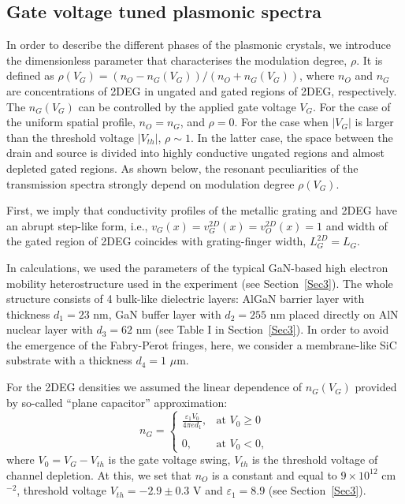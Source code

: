 \documentclass[%
 reprint,
 amsmath,amssymb,
 aps,
]{revtex4-2}
\begin{document}
\subsection{Gate voltage tuned plasmonic spectra}
In order to describe the different phases of the plasmonic crystals, we introduce the dimensionless parameter that characterises the modulation degree, $\rho$. It is defined as $\rho(V_G )=(n_O-n_G (V_G))/(n_{O}+n_{G}(V_G)) $, where $n_{O}$ and $n_{G}$ are concentrations of 2DEG in ungated and gated regions of 2DEG, respectively. The $n_G (V_G)$ can be controlled by the applied gate voltage $V_G$.
For the case of the uniform spatial profile,  $n_O = n_G$,  and  $\rho=0$.  For the case when $|V_G|$ is larger than the threshold voltage $|V_{th}|$, $\rho \sim 1$. In the latter case, the space between the drain and source is divided into highly conductive ungated regions and almost depleted gated regions. As shown below, the resonant peculiarities of the transmission spectra strongly depend on modulation degree $\rho (V_G)$.

First, we imply that conductivity profiles of the metallic grating and 2DEG have an abrupt step-like form, i.e., $v_G (x)= v_G^{2D} (x) = v_O^{2D} (x) = 1$ and width of the gated region of 2DEG coincides with grating-finger width, $L_G^{2D} = L_G$.

In calculations, we used the parameters of the typical GaN-based high electron mobility heterostructure used in the experiment (see Section~\ref{Sec3}).
The whole structure consists of 4 bulk-like dielectric layers:  AlGaN barrier layer with thickness $d_{1}=23$ nm, GaN buffer layer with $d_{2}=255$ nm placed directly on AlN nuclear layer with $d_{3}=62$ nm (see Table I  in Section~\ref{Sec3}). In order to avoid the emergence of the Fabry-P$\acute{\text{e}}$rot fringes, here, we consider a membrane-like SiC substrate with a thickness  $d_{4}=1$ $\mu$m.

For the 2DEG densities we assumed the linear dependence of $n_{G}(V_G)$ provided by so-called “plane capacitor” approximation:
\begin{equation}
n_{G}=\left\{
\begin{array}{cc}
 \displaystyle{\frac{\varepsilon_{1}V_0}{4\pi e d_{1}}},    & \text{at}\,\, V_0\geq 0   \\\\
     0, &  \text{at}\,\, V_0<0,
\end{array}
\right.
\label{capacitor}
\end{equation}
where $V_0 = V_G - V_{th}$ is the gate voltage swing, $V_{th}$ is the threshold voltage of channel depletion. At this, we set that $n_O$ is a constant and equal to $9 \times 10^{12}$ cm$^{-2}$, threshold voltage $V_{th}=-2.9 \pm 0.3$ V and $\varepsilon_{1} = 8.9$ (see Section~\ref{Sec3}). 
\end{document}
